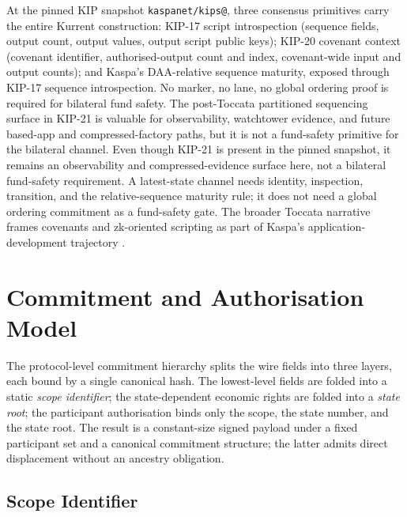 \documentclass[10pt,a4paper]{article}
\begin{document}
At the pinned KIP snapshot \texttt{kaspanet/kips@\kipsnapshot}, three consensus primitives carry the entire Kurrent construction: KIP-17 script introspection (sequence fields, output count, output values, output script public keys); KIP-20 covenant context (covenant identifier, authorised-output count and index, covenant-wide input and output counts); and Kaspa's DAA-relative sequence maturity, exposed through KIP-17 sequence introspection. No marker, no lane, no global ordering proof is required for bilateral fund safety. The post-Toccata partitioned sequencing surface in KIP-21 \cite{kip21} is valuable for observability, watchtower evidence, and future based-app and compressed-factory paths, but it is not a fund-safety primitive for the bilateral channel. Even though KIP-21 is present in the pinned snapshot, it remains an observability and compressed-evidence surface here, not a bilateral fund-safety requirement. A latest-state channel needs identity, inspection, transition, and the relative-sequence maturity rule; it does not need a global ordering commitment as a fund-safety gate. The broader Toccata narrative frames covenants and zk-oriented scripting as part of Kaspa's application-development trajectory \cite{kaspaBuild,toccataOutlook}.



\section{Commitment and Authorisation Model}
\label{sec:commitment}

The protocol-level commitment hierarchy splits the wire fields into three layers, each bound by a single canonical hash. The lowest-level fields are folded into a static \emph{scope identifier}; the state-dependent economic rights are folded into a \emph{state root}; the participant authorisation binds only the scope, the state number, and the state root. The result is a constant-size signed payload under a fixed participant set and a canonical commitment structure; the latter admits direct displacement without an ancestry obligation.

\subsection{Scope Identifier}
\label{sec:scope-id}
\end{document}
